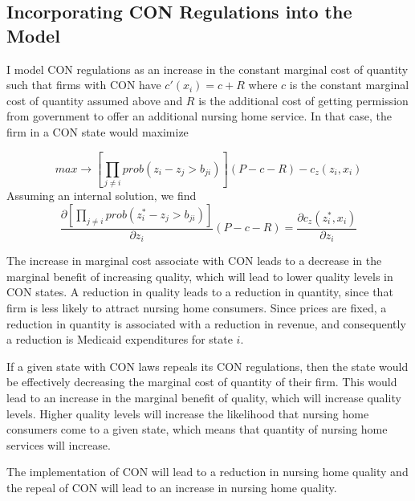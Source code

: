 \documentclass[../Main.tex]{subfiles}
\begin{document}
\subsection{Incorporating CON Regulations into the Model}

I model CON regulations as an increase in the constant marginal cost of quantity such that firms with CON have $c'(x_i) = c + R$ where $c$ is the constant marginal cost of quantity assumed above and $R$ is the additional cost of getting permission from government to offer an additional nursing home service. In that case, the firm in a CON state would maximize

$$max \rightarrow [\prod_{j\neq i} prob(z_i -z_j > b_{ji})](P-c - R) - c_z(z_i,x_i)$$
Assuming an internal solution, we find 
 $$\frac{\partial [\prod_{j\neq i} prob(z_i^* -z_j > b_{ji})]}{\partial z_i}(P-c-R) = \frac{\partial c_z(z_i^*,x_i)}{\partial z_i}$$

The increase in marginal cost associate with CON leads to a decrease in the marginal benefit of increasing quality, which will lead to lower quality levels in CON states. A reduction in quality leads to a reduction in quantity, since that firm is less likely to attract nursing home consumers. Since prices are fixed, a reduction in quantity is associated with a reduction in revenue, and consequently a reduction is Medicaid expenditures for state $i$. 

If a given state with CON laws repeals its CON regulations, then the state would be effectively decreasing the marginal cost of quantity of their firm. This would lead to an increase in the marginal benefit of quality, which will increase quality levels. Higher quality levels will increase the likelihood that nursing home consumers come to a given state, which means that quantity of nursing home services will increase.



\begin{Proposition}
The implementation of CON will lead to a reduction in nursing home quality and the repeal of CON will lead to an increase in nursing home quality. 
\end{Proposition}
\end{document}

